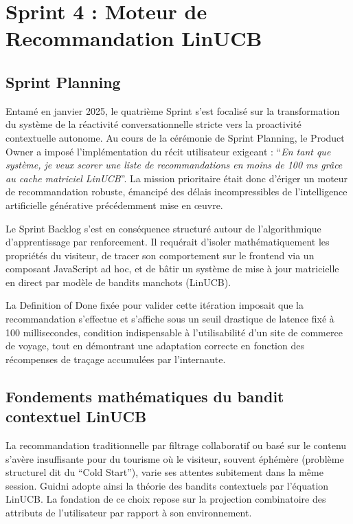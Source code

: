 \chapter{Sprint 4 : Moteur de Recommandation LinUCB}

\section{Sprint Planning}

Entamé en janvier 2025, le quatrième Sprint s'est focalisé sur la transformation du système de la réactivité conversationnelle stricte vers la proactivité contextuelle autonome. Au cours de la cérémonie de Sprint Planning, le Product Owner a imposé l'implémentation du récit utilisateur exigeant : \enquote{\textit{En tant que système, je veux scorer une liste de recommandations en moins de 100 ms grâce au cache matriciel LinUCB}}. La mission prioritaire était donc d'ériger un moteur de recommandation robuste, émancipé des délais incompressibles de l'intelligence artificielle générative précédemment mise en œuvre.

Le Sprint Backlog s'est en conséquence structuré autour de l'algorithmique d'apprentissage par renforcement. Il requérait d'isoler mathématiquement les propriétés du visiteur, de tracer son comportement sur le frontend via un composant JavaScript ad hoc, et de bâtir un système de mise à jour matricielle en direct par modèle de bandits manchots (LinUCB).

La Definition of Done fixée pour valider cette itération imposait que la recommandation s'effectue et s'affiche sous un seuil drastique de latence fixé à 100 millisecondes, condition indispensable à l'utilisabilité d'un site de commerce de voyage, tout en démontrant une adaptation correcte en fonction des récompenses de traçage accumulées par l'internaute.

\section{Fondements mathématiques du bandit contextuel LinUCB}

La recommandation traditionnelle par filtrage collaboratif ou basé sur le contenu s'avère insuffisante pour du tourisme où le visiteur, souvent éphémère (problème structurel dit du \enquote{Cold Start}), varie ses attentes subitement dans la même session. Guidni adopte ainsi la théorie des bandits contextuels par l'équation LinUCB. La fondation de ce choix repose sur la projection combinatoire des attributs de l'utilisateur par rapport à son environnement.

